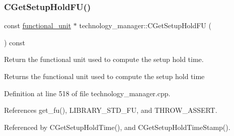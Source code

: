 \subsubsection{\texorpdfstring{C\+Get\+Setup\+Hold\+F\+U()}{CGetSetupHoldFU()}}
{\footnotesize\ttfamily const \hyperlink{structfunctional__unit}{functional\+\_\+unit} $\ast$ technology\+\_\+manager\+::\+C\+Get\+Setup\+Hold\+FU (\begin{DoxyParamCaption}{ }\end{DoxyParamCaption}) const\hspace{0.3cm}{\ttfamily [private]}}



Return the functional unit used to compute the setup hold time. 

\begin{DoxyReturn}{Returns}
the functional unit used to compute the setup hold time 
\end{DoxyReturn}


Definition at line 518 of file technology\+\_\+manager.\+cpp.



References get\+\_\+fu(), L\+I\+B\+R\+A\+R\+Y\+\_\+\+S\+T\+D\+\_\+\+FU, and T\+H\+R\+O\+W\+\_\+\+A\+S\+S\+E\+RT.



Referenced by C\+Get\+Setup\+Hold\+Time(), and C\+Get\+Setup\+Hold\+Time\+Stamp().

